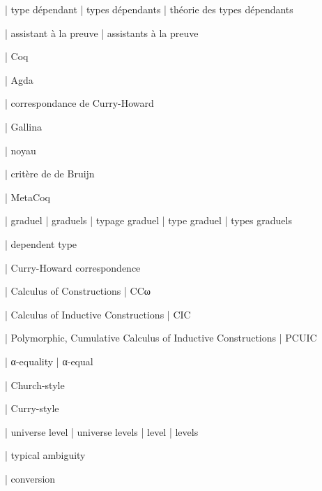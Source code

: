 






  | type dépendant
  | types dépendants
  | théorie des types dépendants

  | assistant à la preuve
  | assistants à la preuve

  | Coq

  | Agda

  | correspondance de Curry-Howard

  | Gallina

  | noyau

  | critère de de Bruijn

  | MetaCoq

  | graduel
  | graduels
  | typage graduel
  | type graduel
  | types graduels


  | dependent type

  | Curry-Howard correspondence


  | Calculus of Constructions
  | CCω

  | Calculus of Inductive Constructions
  | CIC

  | Polymorphic, Cumulative Calculus of Inductive Constructions
  | PCUIC

  | α-equality
  | α-equal 

  | Church-style

  | Curry-style

  | universe level
  | universe levels
  | level
  | levels

  | typical ambiguity


  | conversion

